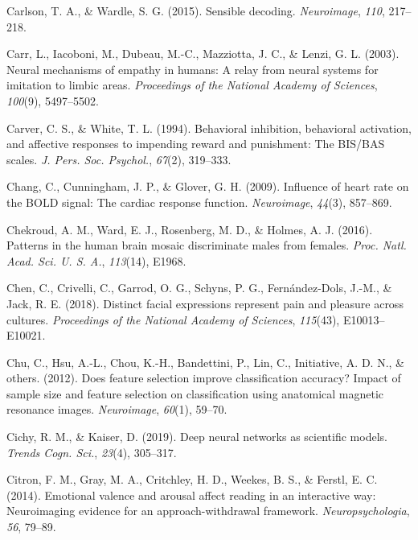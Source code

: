 \documentclass[12pt,american,a4paper,oneside,]{memoir} %
\begin{document}
\leavevmode\hypertarget{ref-Carlson2015-bz}{}%
Carlson, T. A., \& Wardle, S. G. (2015). Sensible decoding. \emph{Neuroimage}, \emph{110}, 217--218.

\leavevmode\hypertarget{ref-carr2003neural}{}%
Carr, L., Iacoboni, M., Dubeau, M.-C., Mazziotta, J. C., \& Lenzi, G. L. (2003). Neural mechanisms of empathy in humans: A relay from neural systems for imitation to limbic areas. \emph{Proceedings of the National Academy of Sciences}, \emph{100}(9), 5497--5502.

\leavevmode\hypertarget{ref-Carver1994-wp}{}%
Carver, C. S., \& White, T. L. (1994). Behavioral inhibition, behavioral activation, and affective responses to impending reward and punishment: The BIS/BAS scales. \emph{J. Pers. Soc. Psychol.}, \emph{67}(2), 319--333.

\leavevmode\hypertarget{ref-Chang2009-vu}{}%
Chang, C., Cunningham, J. P., \& Glover, G. H. (2009). Influence of heart rate on the BOLD signal: The cardiac response function. \emph{Neuroimage}, \emph{44}(3), 857--869.

\leavevmode\hypertarget{ref-Chekroud2016-tc}{}%
Chekroud, A. M., Ward, E. J., Rosenberg, M. D., \& Holmes, A. J. (2016). Patterns in the human brain mosaic discriminate males from females. \emph{Proc. Natl. Acad. Sci. U. S. A.}, \emph{113}(14), E1968.

\leavevmode\hypertarget{ref-chen2018distinct}{}%
Chen, C., Crivelli, C., Garrod, O. G., Schyns, P. G., Fernández-Dols, J.-M., \& Jack, R. E. (2018). Distinct facial expressions represent pain and pleasure across cultures. \emph{Proceedings of the National Academy of Sciences}, \emph{115}(43), E10013--E10021.

\leavevmode\hypertarget{ref-chu2012does}{}%
Chu, C., Hsu, A.-L., Chou, K.-H., Bandettini, P., Lin, C., Initiative, A. D. N., \& others. (2012). Does feature selection improve classification accuracy? Impact of sample size and feature selection on classification using anatomical magnetic resonance images. \emph{Neuroimage}, \emph{60}(1), 59--70.

\leavevmode\hypertarget{ref-Cichy2019-zf}{}%
Cichy, R. M., \& Kaiser, D. (2019). Deep neural networks as scientific models. \emph{Trends Cogn. Sci.}, \emph{23}(4), 305--317.

\leavevmode\hypertarget{ref-citron2014emotional}{}%
Citron, F. M., Gray, M. A., Critchley, H. D., Weekes, B. S., \& Ferstl, E. C. (2014). Emotional valence and arousal affect reading in an interactive way: Neuroimaging evidence for an approach-withdrawal framework. \emph{Neuropsychologia}, \emph{56}, 79--89.
\end{document}
